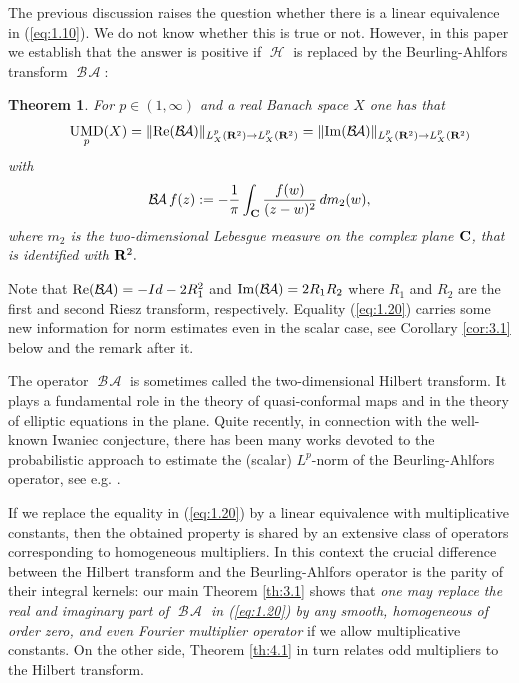 \documentclass[11pt,a4paper,twoside,draft]{amsart}
\theoremstyle{definition}
\newtheorem{theorem}[lemma]{Theorem}
\newcommand{\thm}[1]{\begin{theorem}\label{#1}\sl }
\newcommand{\ethm}{\end{theorem}}
\newcommand{\beqla}[1] {\begin {eqnarray}\label{#1}}
\def\eeq {\end {eqnarray}}
\newcommand{\real}{{\bf R}}
\newcommand{\complex}{{\bf C}}
\DeclareMathOperator{\htt}{{\mathcal H}}
\DeclareMathOperator{\ba}{{\mathcal B\!\mathcal A}}
\DeclareMathOperator{\umd}{{\rm UMD}}
\newcommand{\refeq}[1]{(\ref{#1})}
\begin{document}
The previous discussion raises the question whether there is a linear equivalence 
in \refeq{eq:1.10}. We do not know whether this is true or not.
However, in this paper we establish that the answer is positive
if $\htt$ is replaced by the Beurling-Ahlfors transform $\ba$:
\medskip

\thm{th:main}
For $p\in (1,\infty )$ and a real Banach space $X$ one has that
\beqla{eq:1.20}
     \hspace*{1.5em}
     \umd_p (X) = \| {\rm Re}(\ba)\|_{L^p_X(\real^2 )\to L^p_X(\real^2 )} 
                = \| {\rm Im}(\ba)\|_{L^p_X(\real^2 )\to L^p_X(\real^2 )} 
\eeq
with
\beqla{eq:1.21}
\ba f(z):=-{\frac{1}{\pi}}\int_{\complex} {\frac{f(w)}{(z-w)^2}}\, dm_2(w),
\eeq
where $m_2$ is the two-dimensional Lebesgue measure on the complex plane $\complex$, that  is identified 
with $\real^2.$
\ethm
\medskip

Note that  ${\rm Re}(\ba) = - Id - 2 R_1^2$ and ${\rm Im}(\ba)=2 R_1R_2$
where $R_1$ and $R_2$ are the first and second Riesz transform, respectively.
Equality (\ref{eq:1.20}) carries some  new information for norm estimates even in 
the scalar case, see Corollary \ref{cor:3.1} below and the remark after it.  

The operator $\ba$ is sometimes called the two-dimensional Hilbert transform. 
It plays a fundamental role in the theory of quasi-conformal maps and in the 
theory of elliptic equations in the plane. Quite recently,
in connection with the well-known Iwaniec conjecture,
there has been many works devoted to  the probabilistic approach to
estimate the (scalar) $L^p$-norm of the Beurling-Ahlfors operator, see e.g.
\cite{Ban1,Volberg,Ban2}.

If we replace the equality in (\ref{eq:1.20}) by a linear equivalence
with multiplicative constants, then the obtained property is shared by an extensive class 
of operators
corresponding to homogeneous multipliers. In this context the crucial difference
between the Hilbert transform and the Beurling-Ahlfors operator is the parity of 
their integral kernels: our main Theorem \ref{th:3.1} shows 
that {\it one may replace the real and imaginary part of
$\ba$ in {\rm \refeq{eq:1.20}} by
 any smooth, homogeneous of order zero, and even
Fourier  multiplier operator} if we allow multiplicative constants.
On the other side, Theorem \ref{th:4.1} in turn relates  odd multipliers
to the Hilbert transform.
\end{document}
